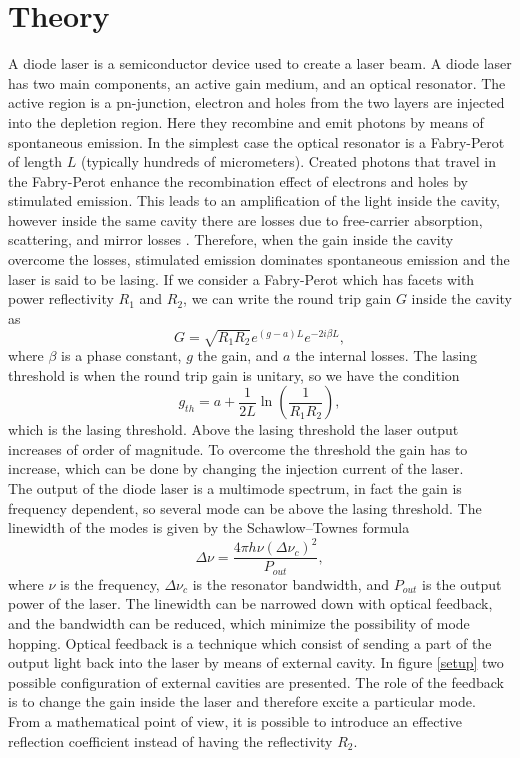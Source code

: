 \documentclass[a4paper,10pt]{article}
\begin{document}
\section{Theory}
A diode laser is a semiconductor device used to create a laser beam. A diode laser has two main components, an active gain medium, and an optical resonator. The active region is a pn-junction, electron and holes from the two layers are injected into the depletion region. Here they recombine and emit photons by means of spontaneous emission. In the simplest case the optical resonator is a Fabry-Perot of length $L$ (typically hundreds of micrometers). Created photons that travel in the Fabry-Perot enhance the recombination effect of electrons and holes by stimulated emission. This leads to an amplification of the light inside the cavity, however inside the same cavity there are losses due to free-carrier absorption, scattering, and mirror losses \cite{tunablelaser}. Therefore, when the gain inside the cavity overcome the losses, stimulated emission dominates spontaneous emission and the laser is said to be lasing. If we consider a Fabry-Perot which has facets with power reflectivity $R_1$ and $R_2$, we can write the round trip gain $G$ inside the cavity as \cite{lasermodulation}
\begin{equation}G = \sqrt{R_1R_2}e^{(g-a)L}e^{-2i\beta L},\end{equation}
where $\beta$ is a phase constant, $g$ the gain, and $a$ the internal losses. The lasing threshold is when the round trip gain is unitary, so we have the condition
\begin{equation}g_{th} = a + \frac{1}{2L}\ln\left(\frac{1}{R_1 R_2}\right),\end{equation}
which is the lasing threshold. Above the lasing threshold the laser output increases of order of magnitude. To overcome the threshold the gain has to increase, which can be done by changing the injection current of the laser.\\
The output of the diode laser is a multimode spectrum, in fact the gain is frequency dependent, so several mode can be above the lasing threshold. The linewidth of the modes is given by the Schawlow–Townes formula \cite{linewidthformula}
\begin{equation}\Delta \nu = \frac{4\pi h\nu (\Delta\nu_c)^2}{P_{out}},\end{equation}
where $\nu$ is the frequency, $\Delta\nu_c$ is the resonator bandwidth, and $P_{out}$ is the output power of the laser. The linewidth can be narrowed down with optical feedback, and the bandwidth can be reduced, which minimize the possibility of mode hopping. Optical feedback is a technique which consist of sending a part of the output light back into the laser by means of external cavity. In figure \ref{setup} two possible configuration of external cavities are presented. The role of the feedback is to change the gain inside the laser and therefore excite a particular mode. From a mathematical point of view, it is possible to introduce an effective reflection coefficient \cite{feedback} instead of having the reflectivity $R_2$.
\end{document}
